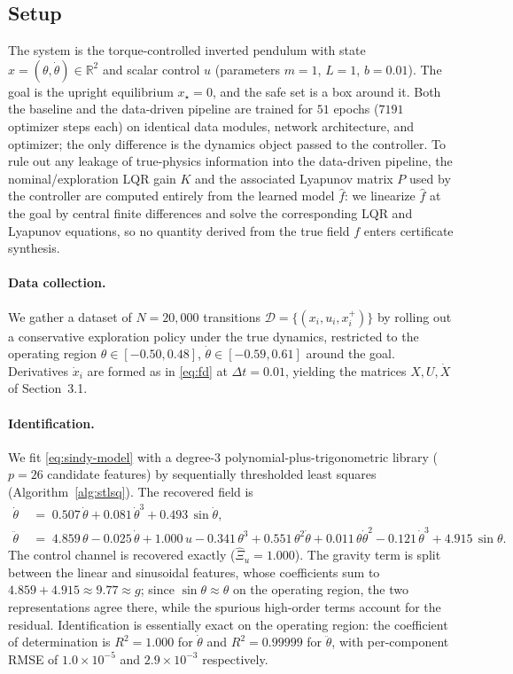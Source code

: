 \documentclass{article}
\newcommand{\R}{\mathbb{R}}
\newcommand{\hf}{\hat{f}}
\begin{document}
\subsection{Setup}
\label{sec:exp-setup}

The system is the torque-controlled inverted pendulum with state
$x=(\theta,\dot\theta)\in\R^2$ and scalar control $u$ (parameters $m=1$, $L=1$,
$b=0.01$). The goal is the upright equilibrium $x_\star=0$, and the safe set is a
box around it. Both the baseline and the data-driven pipeline are trained for
$51$ epochs ($7191$ optimizer steps each) on identical data modules, network
architecture, and optimizer; the only difference is the dynamics object passed to
the controller. To rule out any leakage of true-physics information into the
data-driven pipeline, the nominal/exploration LQR gain $K$ and the associated
Lyapunov matrix $P$ used by the controller are computed entirely from the learned
model $\hf$: we linearize $\hf$ at the goal by central finite differences and
solve the corresponding LQR and Lyapunov equations, so no quantity derived from
the true field $f$ enters certificate synthesis.

\paragraph{Data collection.}
We gather a dataset of $N=20{,}000$ transitions
$\mathcal{D}=\{(x_i,u_i,x_i^+)\}$ by rolling out a conservative exploration policy
under the true dynamics, restricted to the operating region
$\theta\in[-0.50,0.48]$, $\dot\theta\in[-0.59,0.61]$ around the goal. Derivatives
$\dot x_i$ are formed as in \eqref{eq:fd} at $\Delta t=0.01$, yielding the
matrices $X,U,\dot X$ of Section~3.1.

\paragraph{Identification.}
We fit \eqref{eq:sindy-model} with a degree-$3$ polynomial-plus-trigonometric
library ($p=26$ candidate features) by sequentially thresholded least squares
(Algorithm~\ref{alg:stlsq}). The recovered field is
\begin{align*}
    \dot\theta\;&=\;0.507\,\dot\theta + 0.081\,\dot\theta^{3} + 0.493\,\sin\dot\theta,\\
    \ddot\theta\;&=\;4.859\,\theta - 0.025\,\dot\theta + 1.000\,u
        - 0.341\,\theta^{3} + 0.551\,\theta^{2}\dot\theta + 0.011\,\theta\dot\theta^{2}
        - 0.121\,\dot\theta^{3} + 4.915\,\sin\theta.
\end{align*}
The control channel is recovered exactly ($\hat\Xi_{u}=1.000$). The gravity term
is split between the linear and sinusoidal features, whose coefficients sum to
$4.859+4.915\approx 9.77\approx g$; since $\sin\theta\approx\theta$ on the
operating region, the two representations agree there, while the spurious
high-order terms account for the residual. Identification is essentially exact on
the operating region: the coefficient of determination is $R^2=1.000$ for
$\dot\theta$ and $R^2=0.99999$ for $\ddot\theta$, with per-component RMSE of
$1.0\times10^{-5}$ and $2.9\times10^{-3}$ respectively.
\end{document}
